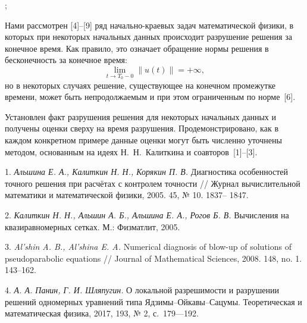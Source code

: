 



; 





Нами рассмотрен [4]--[9] ряд начально-краевых задач математической физики, в которых при некоторых начальных данных происходит разрушение решения за конечное время. Как правило, это означает обращение нормы решения в бесконечность за конечное время:
\begin{equation*}
\lim_{t\to T_0-0}\|u(t)\|=+\infty,
\end{equation*}
но в некоторых случаях решение, существующее на конечном промежутке времени, может быть непродолжаемым и при этом ограниченным по норме~[6].

Установлен факт разрушения решения для некоторых начальных данных и получены оценки сверху на время разрушения. Продемонстрировано, как в каждом конкретном примере данные оценки могут быть численно уточнены методом, основанным на идеях Н.~Н.~Калиткина и соавторов~[1]--[3].





\litlist

1. {\it Альшина Е. А., Калиткин Н. Н., Корякин П. В.} Диагностика особенностей точного решения при расчётах с
контролем точности // Журнал вычислительной математики и математической физики, 2005. 45, № 10. 1837–
1847.

2. {\it Калиткин Н. Н., Альшин А. Б., Альшина Е. А., Рогов Б. В.} Вычисления на квазиравномерных сетках. М.: Физматлит, 2005.

3. {\it Al’shin A. B., Al’shina E. A.} Numerical diagnosis of blow-up of solutions of pseudoparabolic equations // Journal of
Mathematical Sciences, 2008. 148, no. 1. 143–162.


4.	{\it А. А. Панин, Г. И. Шляпугин.} О локальной разрешимости и разрушении решений одномерных уравнений типа Ядзимы–Ойкавы–Сацумы. Теоретическая и математическая физика, 2017, 193, № 2, с.~179—192. {\sloppy


}

